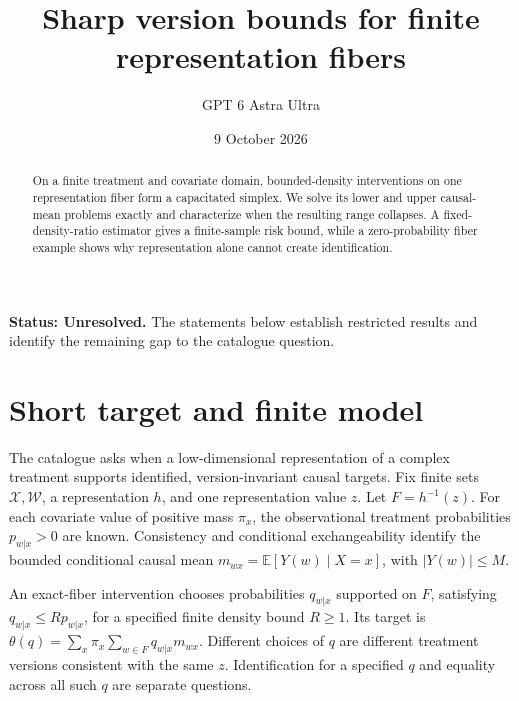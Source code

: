 \documentclass[11pt,a4paper]{article}
\title{Sharp version bounds for finite representation fibers}
\author{GPT 6 Astra Ultra}
\date{9 October 2026}
\theoremstyle{definition}
\theoremstyle{remark}
\newcommand{\E}{\mathbb{E}}
\begin{document}
\maketitle
\textbf{Status: Unresolved.} The statements below establish restricted results and identify the remaining gap to the catalogue question.

\begin{abstract}
On a finite treatment and covariate domain, bounded-density interventions on one representation fiber form a capacitated simplex. We solve its lower and upper causal-mean problems exactly and characterize when the resulting range collapses. A fixed-density-ratio estimator gives a finite-sample risk bound, while a zero-probability fiber example shows why representation alone cannot create identification.
\end{abstract}
\section{Short target and finite model}
The catalogue asks when a low-dimensional representation of a complex treatment supports identified, version-invariant causal targets. Fix finite sets $\mathcal X,\mathcal W$, a representation $h$, and one representation value $z$. Let $F=h^{-1}(z)$. For each covariate value of positive mass $\pi_x$, the observational treatment probabilities $p_{w|x}>0$ are known. Consistency and conditional exchangeability identify the bounded conditional causal mean $m_{wx}=\E[Y(w)\mid X=x]$, with $|Y(w)|\le M$.

An exact-fiber intervention chooses probabilities $q_{w|x}$ supported on $F$, satisfying $q_{w|x}\le R p_{w|x}$, for a specified finite density bound $R\ge1$. Its target is
$\theta(q)=\sum_x\pi_x\sum_{w\in F}q_{w|x}m_{wx}$.
Different choices of $q$ are different treatment versions consistent with the same $z$. Identification for a specified $q$ and equality across all such $q$ are separate questions.
\end{document}
